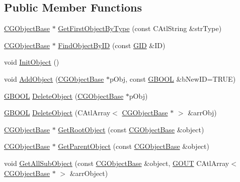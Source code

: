 \subsection*{Public Member Functions}
\begin{DoxyCompactItemize}
\item 
\hyperlink{class_c_g_object_base}{C\+G\+Object\+Base} $\ast$ \hyperlink{class_c_g_object_manager_aa9bbad2507c26f0acdd69c2089d4d2ca}{Get\+First\+Object\+By\+Type} (const C\+Atl\+String \&str\+Type)
\item 
\hyperlink{class_c_g_object_base}{C\+G\+Object\+Base} $\ast$ \hyperlink{class_c_g_object_manager_a536801f47f0a1bb9fb2e4006e0cf683b}{Find\+Object\+By\+I\+D} (const \hyperlink{_g_types_8h_a5b96ecb16d8e437977d12cd40aa6f6d8}{G\+I\+D} \&I\+D)
\item 
void \hyperlink{class_c_g_object_manager_a50320dfe125f0d92d54dd2db010a14ab}{Init\+Object} ()
\item 
void \hyperlink{class_c_g_object_manager_a0ddfa7f0ee20214ec03ff92cd3ad18e9}{Add\+Object} (\hyperlink{class_c_g_object_base}{C\+G\+Object\+Base} $\ast$p\+Obj, const \hyperlink{_g_types_8h_a2901915743626352a6820c5405f556dc}{G\+B\+O\+O\+L} \&b\+New\+I\+D=T\+R\+U\+E)
\item 
\hyperlink{_g_types_8h_a2901915743626352a6820c5405f556dc}{G\+B\+O\+O\+L} \hyperlink{class_c_g_object_manager_a7f94b1430f9dc37c500523d80991b0f7}{Delete\+Object} (\hyperlink{class_c_g_object_base}{C\+G\+Object\+Base} $\ast$p\+Obj)
\item 
\hyperlink{_g_types_8h_a2901915743626352a6820c5405f556dc}{G\+B\+O\+O\+L} \hyperlink{class_c_g_object_manager_a65c8a6766e7d9acdbe0edbfac551ccd9}{Delete\+Object} (C\+Atl\+Array$<$ \hyperlink{class_c_g_object_base}{C\+G\+Object\+Base} $\ast$ $>$ \&arr\+Obj)
\item 
\hyperlink{class_c_g_object_base}{C\+G\+Object\+Base} $\ast$ \hyperlink{class_c_g_object_manager_aadbd8a4b3c170c20cf585bf74c45635b}{Get\+Root\+Object} (const \hyperlink{class_c_g_object_base}{C\+G\+Object\+Base} \&object)
\item 
\hyperlink{class_c_g_object_base}{C\+G\+Object\+Base} $\ast$ \hyperlink{class_c_g_object_manager_acc3c827b1749e6763bd50db0ca24c34f}{Get\+Parent\+Object} (const \hyperlink{class_c_g_object_base}{C\+G\+Object\+Base} \&object)
\item 
void \hyperlink{class_c_g_object_manager_a35f193396d98484653586b1539ccca13}{Get\+All\+Sub\+Object} (const \hyperlink{class_c_g_object_base}{C\+G\+Object\+Base} \&object, \hyperlink{_g_types_8h_a0858ec221262e635612871d70ca233ad}{G\+O\+U\+T} C\+Atl\+Array$<$ \hyperlink{class_c_g_object_base}{C\+G\+Object\+Base} $\ast$ $>$ \&arr\+Object)

\end{DoxyCompactItemize}
